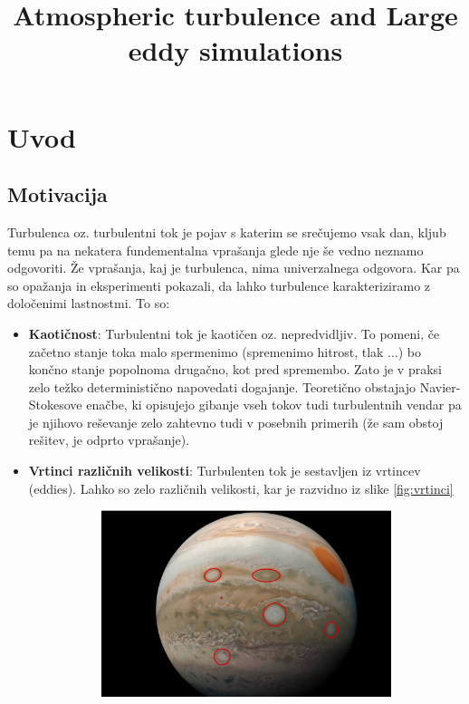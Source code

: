 \documentclass[mat2, tisk]{fmfdelo}
\title{Atmospheric turbulence and Large eddy simulations}
\begin{document}
\section{Uvod}

\subsection{Motivacija}
Turbulenca oz. turbulentni tok je pojav s katerim se srečujemo vsak dan, kljub temu pa na nekatera fundementalna
vprašanja glede nje še vedno neznamo odgovoriti. Že vprašanja, kaj je turbulenca, nima
univerzalnega odgovora. Kar pa so opažanja in eksperimenti pokazali, da lahko turbulence
karakteriziramo z določenimi lastnostmi. To so:
\begin{itemize}
\item \textbf{Kaotičnost}: Turbulentni tok je kaotičen oz. nepredvidljiv. To pomeni, če
začetno stanje toka malo spermenimo (spremenimo hitrost, tlak ...) bo končno stanje popolnoma
drugačno, kot pred spremembo. Zato je v praksi zelo težko deterministično napovedati dogajanje.
Teoretično obstajajo Navier-Stokesove enačbe, ki opisujejo gibanje vseh tokov tudi turbulentnih
vendar pa je njihovo reševanje zelo zahtevno tudi v posebnih primerih (že sam obstoj rešitev, je 
odprto vprašanje).
\item \textbf{Vrtinci različnih velikosti}: Turbulenten tok je sestavljen iz vrtincev (eddies). Lahko so zelo
različnih velikosti, kar je razvidno iz slike \ref{fig:vrtinci}
\begin{figure}[h!]
  \centering
  \begin{subfigure}{.5\textwidth}
    \centering
    \includegraphics[width=0.95\linewidth]{slike/vrtinci.jpeg}
  \end{subfigure}%

\end{figure}
\end{itemize}
\end{document}

